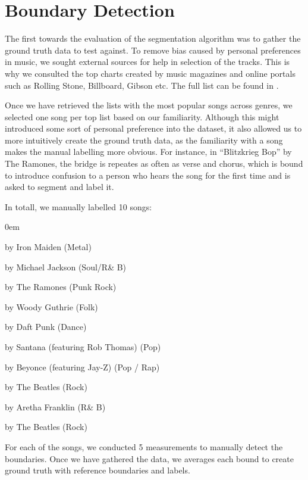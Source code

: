 \section{Boundary Detection}

The first towards the evaluation of the segmentation algorithm was to gather the ground truth data to test against. To remove bias caused by personal preferences in music, we sought external sources for help in selection of the tracks. This is why we consulted the top charts created by music magazines and online portals such as Rolling Stone, Billboard, Gibson etc. The full list can be found in \cite{toplists}.

Once we have retrieved the lists with the most popular songs across genres, we selected one song per top list based on our familiarity. Although this might introduced some sort of personal preference into the dataset, it also allowed us to more intuitively create the ground truth data, as the familiarity with a song makes the manual labelling more obvious. For instance, in “Blitzkrieg Bop” by The Ramones, the bridge is repeates as often as verse and chorus, which is bound to introduce confusion to a person who hears the song for the first time and is asked to segment and label it.

In totall, we manually labelled 10 songs:
\vspace{-10pt}
\begin{description}
\itemsep0em 
\item[“The Number of The Beast”] by Iron Maiden (Metal)
\item[“Rock With You”] by Michael Jackson (Soul/R\& B)
\item[“Blitzkrieg Bop”] by The Ramones (Punk Rock)
\item[“This Land is Your Land“] by Woody Guthrie (Folk)
\item[“One More Time”] by Daft Punk (Dance)
\item[“Smooth”] by Santana (featuring Rob Thomas) (Pop)
\item[ “Crazy in Love”] by Beyonce (featuring Jay-Z) (Pop / Rap)
\item["Help!"] by The Beatles (Rock)
\item["Respect"] by Aretha Franklin (R\& B)
\item["Back in the USSR"] by The Beatles (Rock)
\end{description}

For each of the songs, we conducted 5 measurements to manually detect the boundaries. Once we have gathered the data, we averages each bound to create ground truth with reference boundaries and labels.

